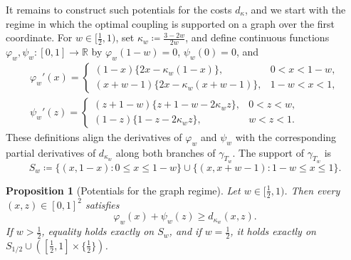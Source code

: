 \documentclass[11pt,a4paper]{article}
\newtheorem{proposition}[theorem]{Proposition}
\theoremstyle{remark}
\newcommand{\R}{\mathbb{R}}
\newcommand{\1}{\mathbf{1}}
\begin{document}
It remains to construct such potentials for the costs $d_\kappa$, and we start with the regime in which the optimal coupling is supported on a graph over the first coordinate.
For $w\in[\frac12,1)$, set $\kappa_w\coloneqq\frac{3-2w}{2w}$, and define continuous functions $\varphi_w,\psi_w:[0,1]\to\R$ by $\varphi_w(1-w)=0$, $\psi_w(0)=0$, and
\begin{equation}
  \label{eq:potential-A}
  \begin{gathered}
  \varphi_w'(x)=
  \begin{cases}
    (1-x)\bigl\{2x-\kappa_w(1-x)\bigr\}, & 0<x<1-w,\\
    (x+w-1)\bigl\{2x-\kappa_w(x+w-1)\bigr\}, & 1-w<x<1,
  \end{cases}\\[0.5ex]
  \psi_w'(z)=
  \begin{cases}
    (z+1-w)\bigl\{z+1-w-2\kappa_wz\bigr\}, & 0<z<w,\\
    (1-z)\bigl\{1-z-2\kappa_wz\bigr\}, & w<z<1.
  \end{cases}
  \end{gathered}
\end{equation}
These definitions align the derivatives of $\varphi_w$ and $\psi_w$ with the corresponding partial derivatives of $d_{\kappa_w}$ along both branches of $\gamma_{T_w}$.
The support of $\gamma_{T_w}$ is
\[
  S_w\coloneqq\{(x,1-x):0\le x\le1-w\}
       \cup\{(x,x+w-1):1-w\le x\le1\}.
\]

\begin{proposition}[Potentials for the graph regime]
\label{prop:dual-A}
Let $w\in[\frac12,1)$.
Then every $(x,z)\in[0,1]^2$ satisfies
\begin{equation}
  \label{eq:dual-A-inequality}
  \varphi_w(x)+\psi_w(z)\ge d_{\kappa_w}(x,z).
\end{equation}
If $w>\frac12$, equality holds exactly on $S_w$, and if $w=\frac12$, it holds exactly on $S_{1/2}\cup([\frac12,1]\times\{\frac12\})$.
\end{proposition}
\end{document}
